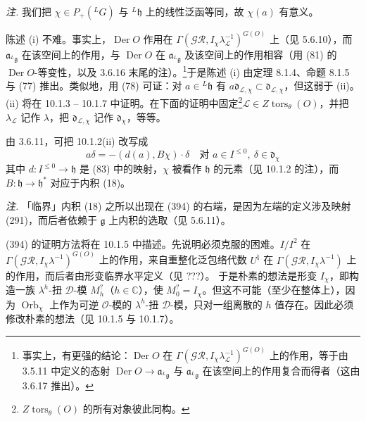 \emph{注.} 我们把 $\chi\in P_{+}({}^{L}G)$ 与 ${}^{L}\mathfrak{h}$ 上的线性泛函等同，故 $\chi(a)$ 有意义。

陈述 (i) 不难。事实上，$\operatorname{Der}O$ 作用在 $\Gamma(\mathcal{GR},I_{\chi}\lambda_{\mathcal{L}}^{-1})^{G(O)}$ 上（见 5.6.10），而 $\mathfrak{a}_{{}^{L}\mathfrak{g}}$ 在该空间上的作用，与 $\operatorname{Der}O$ 在 $\mathfrak{a}_{{}^{L}\mathfrak{g}}$ 及该空间上的作用相容（用 (81) 的 $\operatorname{Der}O$-等变性，以及 3.6.16 末尾的注）。\footnote{事实上，有更强的结论：$\operatorname{Der}O$ 在 $\Gamma(\mathcal{GR},I_{\chi}\lambda_{\mathcal{L}}^{-1})^{G(O)}$ 上的作用，等于由 3.5.11 中定义的态射 $\operatorname{Der}O\to\mathfrak{a}_{{}^{L}\mathfrak{g}}$ 与 $\mathfrak{a}_{{}^{L}\mathfrak{g}}$ 在该空间上的作用复合而得者（这由 3.6.17 推出）。}于是陈述 (i) 由定理 8.1.4、命题 8.1.5 与 (77) 推出。类似地，用 (78) 可证：对 $a\in{}^{L}\mathfrak{h}$ 有 $a\mathfrak{d}_{\mathcal{L},\chi}\subset\mathfrak{d}_{\mathcal{L},\chi}$，但这弱于 (ii)。(ii) 将在 10.1.3 – 10.1.7 中证明。在下面的证明中固定\footnote{$Z\operatorname{tors}_{\theta}(O)$ 的所有对象彼此同构。}$\mathcal{L}\in Z\operatorname{tors}_{\theta}(O)$，并把 $\lambda_{\mathcal{L}}$ 记作 $\lambda$，把 $\mathfrak{d}_{\mathcal{L},\chi}$ 记作 $\mathfrak{d}_{\chi}$，等等。

 由 3.6.11，可把 10.1.2(ii) 改写成
\begin{equation}\tag{394}
a\delta=-(d(a),B\chi)\cdot\delta\quad\text{对 } a\in I^{\le 0},\ \delta\in\mathfrak{d}_{\chi}
\end{equation}
其中 $d:I^{\le 0}\to\mathfrak{h}$ 是 (83) 中的映射，$\chi$ 被看作 $\mathfrak{h}$ 的元素（见 10.1.2 的注），而 $B:\mathfrak{h}\to\mathfrak{h}^{*}$ 对应于内积 (18)。

\emph{注.} 「临界」内积 (18) 之所以出现在 (394) 的右端，是因为左端的定义涉及映射 (291)，而后者依赖于 $\mathfrak{g}$ 上内积的选取（见 5.6.11）。

 (394) 的证明方法将在 10.1.5 中描述。先说明必须克服的困难。$I/I^{2}$ 在 $\Gamma(\mathcal{GR},I_{\chi}\lambda^{-1})^{G(O)}$ 上的作用，来自重整化泛包络代数 $U^{\natural}$ 在 $\Gamma(\mathcal{GR},I_{\chi}\lambda^{-1})$ 上的作用，而后者由形变临界水平定义（见 ???）。
于是朴素的想法是形变 $I_{\chi}$，即构造一族 $\lambda^{h}$-扭 $\mathcal{D}$-模 $M^{?}_{h}$（$h\in\mathbb{C}$），使 $M^{?}_{0}=I_{\chi}$。但这不可能（至少在整体上），因为 $\operatorname{Orb}_{\chi}$ 上作为可逆 $\mathcal{O}$-模的 $\lambda^{h}$-扭 $\mathcal{D}$-模，只对一组离散的 $h$ 值存在。因此必须修改朴素的想法（见 10.1.5 与 10.1.7）。

